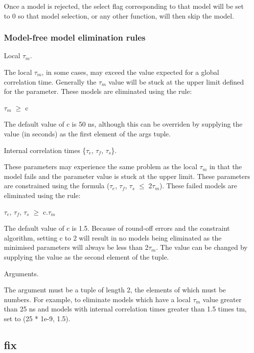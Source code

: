 Once a model is rejected, the select flag corresponding to that model will be set to 0 so
that model selection, or any other function, will then skip the model.



\subsubsection{Model-free model elimination rules}

Local $\tau_m$.

The local $\tau_m$, in some cases, may exceed the value expected for a global correlation time.
Generally the $\tau_m$ value will be stuck at the upper limit defined for the parameter.  These
models are eliminated using the rule:

    $\tau_m$ $\ge$ c

The default value of c is 50 ns, although this can be overriden by supplying the value (in
seconds) as the first element of the args tuple.


Internal correlation times \{$\tau_e$, $\tau_f$, $\tau_s$\}.

These parameters may experience the same problem as the local $\tau_m$ in that the model fails and
the parameter value is stuck at the upper limit.  These parameters are constrained using the
formula ($\tau_e$, $\tau_f$, $\tau_s$ $\le$ 2$\tau_m$).  These failed models are eliminated using the rule:

    $\tau_e$, $\tau_f$, $\tau_s$ $\ge$ c.$\tau_m$

The default value of c is 1.5.  Because of round-off errors and the constraint algorithm,
setting c to 2 will result in no models being eliminated as the minimised parameters will
always be less than 2$\tau_m$.  The value can be changed by supplying the value as the second
element of the tuple.


Arguments.

The 
 argument must be a tuple of length 2, the elements of which must be numbers.  For
example, to eliminate models which have a local $\tau_m$ value greater than 25 ns and models with
internal correlation times greater than 1.5 times tm, set 
 to (25 * 1e-9, 1.5).


\newpage

\subsection{fix}


